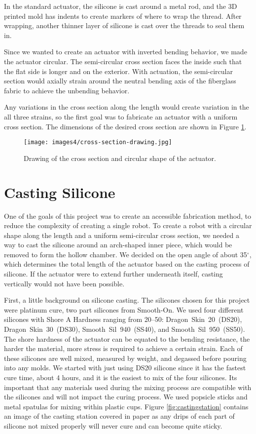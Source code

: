 In the standard actuator, the silicone is cast around a metal rod, and the 3D printed mold has indents to create markers of where to wrap the thread. After wrapping, another thinner layer of silicone is cast over the threads to seal them in. 

Since we wanted to create an actuator with inverted bending behavior, we made the actuator circular. The semi-circular cross section faces the inside such that the flat side is longer and on the exterior. With actuation, the semi-circular section would axially strain around the neutral bending axis of the fiberglass fabric to achieve the unbending behavior. 

Any variations in the cross section along the length would create variation in the all three strains, so the first goal was to fabricate an actuator with a uniform cross section. The dimensions of the desired cross section are shown in Figure \ref{fig:crosssection}.

\begin{figure}[h]
    \centering
    \texttt{[image: images4/cross-section-drawing.jpg]}
    \caption{Drawing of the cross section and circular shape of the actuator.}
    \label{fig:crosssection}
\end{figure}

\section{Casting Silicone}
One of the goals of this project was to create an accessible fabrication method, to reduce the complexity of creating a single robot. To create a robot with a circular shape along the length and a uniform semi-circular cross section, we needed a way to cast the silicone around an arch-shaped inner piece, which would be removed to form the hollow chamber. We decided on the open angle of about 35$^\circ$, which determines the total length of the actuator based on the casting process of silicone. If the actuator were to extend further underneath itself, casting vertically would not have been possible. 

First, a little background on silicone casting. The silicones chosen for this project were platinum cure, two part silicones from Smooth-On. We used four different silicones with Shore A Hardness ranging from 20--50: Dragon~Skin~20~(DS20), Dragon~Skin~30~(DS30), Smooth~Sil~940~(SS40), and Smooth~Sil~950~(SS50). The shore hardness of the actuator can be equated to the bending resistance, the harder the material, more stress is required to achieve a certain strain. Each of these silicones are well mixed, measured by weight, and degassed before pouring into any molds. We started with just using DS20 silicone since it has the fastest cure time, about 4 hours, and it is the easiest to mix of the four silicones. Its important that any materials used during the mixing process are compatible with the silicones and will not impact the curing process. We used popsicle sticks and metal spatulas for mixing within plastic cups. Figure \ref{fig:castingstation} contains an image of the casting station covered in paper as any drips of each part of silicone not mixed properly will never cure and can become quite sticky. 

